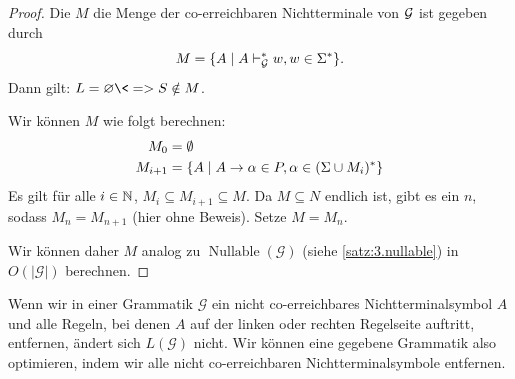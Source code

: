 \begin{proof}
    Die $M$ die Menge der co-erreichbaren Nichtterminale von $\mathcal{G}$ ist gegeben durch
    $$M = \{ A \mid A \vdash^*_\mathcal{G} w, w\in \Sigma^* \}
    \text.$$
    Dann gilt: $L =\varnothing \<=> S\notin M$.
    
    Wir können $M$ wie folgt berechnen:
    \begin{align*}
      M_0 &= \emptyset \\
      M_{i+1} &=  \{ A \mid A \-> \alpha\in P, \alpha\in(\Sigma\cup M_i)^* \}
    \end{align*}
    Es gilt für alle $i\in\mathbb{N}$, $M_i\subseteq M_{i+1} \subseteq M$.
    Da $M\subseteq N$ endlich ist, gibt es ein $n$, sodass $M_n =
    M_{n+1}$ (hier ohne Beweis). Setze $M = M_n$.
    
    Wir können daher $M$ analog zu $\operatorname{Nullable}(\mathcal{G})$ (siehe \autoref{satz:3.nullable}) in $O(|\mathcal{G}|)$ berechnen.
\end{proof}
\begin{Bem}
  Wenn wir in einer Grammatik $\mathcal{G}$ ein nicht co-erreichbares
  Nichtterminalsymbol $A$ und alle Regeln, bei denen $A$ auf der
  linken oder rechten Regelseite auftritt, entfernen, ändert sich
  $L(\mathcal{G})$ nicht.  Wir können eine gegebene Grammatik also
  optimieren, indem wir alle nicht co-erreichbaren
  Nichtterminalsymbole entfernen.
\end{Bem}



